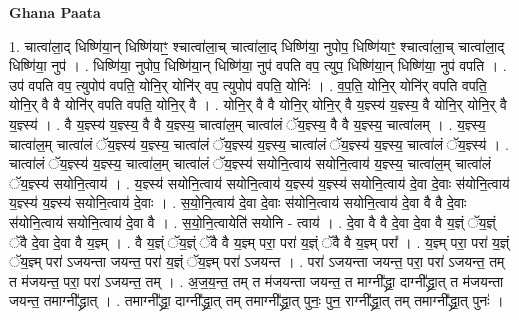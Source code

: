 \documentclass[17pt]{extarticle}
\begin{document}
\textbf{Ghana Paata } \newline

1. चात्वा॑ला॒द् धिष्णि॑या॒न् धिष्णि॑याꣳ॒॒ श्चात्वा॑ला॒च् चात्वा॑ला॒द् धिष्णि॑या॒ नुपोप॒ धिष्णि॑याꣳ॒॒ श्चात्वा॑ला॒च् चात्वा॑ला॒द् धिष्णि॑या॒ नुप॑ । . धिष्णि॑या॒ नुपोप॒ धिष्णि॑या॒न् धिष्णि॑या॒ नुप॑ वपति वप॒ त्युप॒ धिष्णि॑या॒न् धिष्णि॑या॒ नुप॑ वपति । . उप॑ वपति वप॒ त्युपोप॑ वपति॒ योनि॒र् योनि॑र् वप॒ त्युपोप॑ वपति॒ योनिः॑ । . व॒प॒ति॒ योनि॒र् योनि॑र् वपति वपति॒ योनि॒र् वै वै योनि॑र् वपति वपति॒ योनि॒र् वै । . योनि॒र् वै वै योनि॒र् योनि॒र् वै य॒ज्ञ्स्य॑ य॒ज्ञ्स्य॒ वै योनि॒र् योनि॒र् वै य॒ज्ञ्स्य॑ । . वै य॒ज्ञ्स्य॑ य॒ज्ञ्स्य॒ वै वै य॒ज्ञ्स्य॒ चात्वा॑ल॒म् चात्वा॑लं ॅय॒ज्ञ्स्य॒ वै वै य॒ज्ञ्स्य॒ चात्वा॑लम् । . य॒ज्ञ्स्य॒ चात्वा॑ल॒म् चात्वा॑लं ॅय॒ज्ञ्स्य॑ य॒ज्ञ्स्य॒ चात्वा॑लं ॅय॒ज्ञ्स्य॑ य॒ज्ञ्स्य॒ चात्वा॑लं ॅय॒ज्ञ्स्य॑ य॒ज्ञ्स्य॒ चात्वा॑लं ॅय॒ज्ञ्स्य॑ । . चात्वा॑लं ॅय॒ज्ञ्स्य॑ य॒ज्ञ्स्य॒ चात्वा॑ल॒म् चात्वा॑लं ॅय॒ज्ञ्स्य॑ सयोनि॒त्वाय॑ सयोनि॒त्वाय॑ य॒ज्ञ्स्य॒ चात्वा॑ल॒म् चात्वा॑लं ॅय॒ज्ञ्स्य॑ सयोनि॒त्वाय॑ । . य॒ज्ञ्स्य॑ सयोनि॒त्वाय॑ सयोनि॒त्वाय॑ य॒ज्ञ्स्य॑ य॒ज्ञ्स्य॑ सयोनि॒त्वाय॑ दे॒वा दे॒वाः स॑योनि॒त्वाय॑ य॒ज्ञ्स्य॑ य॒ज्ञ्स्य॑ सयोनि॒त्वाय॑ दे॒वाः । . स॒यो॒नि॒त्वाय॑ दे॒वा दे॒वाः स॑योनि॒त्वाय॑ सयोनि॒त्वाय॑ दे॒वा वै वै दे॒वाः स॑योनि॒त्वाय॑ सयोनि॒त्वाय॑ दे॒वा वै । . स॒यो॒नि॒त्वायेति॑ सयोनि - त्वाय॑ । . दे॒वा वै वै दे॒वा दे॒वा वै य॒ज्ञ्ं ॅय॒ज्ञ्ं ॅवै दे॒वा दे॒वा वै य॒ज्ञ्म् । . वै य॒ज्ञ्ं ॅय॒ज्ञ्ं ॅवै वै य॒ज्ञ्म् परा॒ परा॑ य॒ज्ञ्ं ॅवै वै य॒ज्ञ्म् परा᳚ । . य॒ज्ञ्म् परा॒ परा॑ य॒ज्ञ्ं ॅय॒ज्ञ्म् परा॑ ऽजयन्ता जयन्त॒ परा॑ य॒ज्ञ्ं ॅय॒ज्ञ्म् परा॑ ऽजयन्त । . परा॑ ऽजयन्ता जयन्त॒ परा॒ परा॑ ऽजयन्त॒ तम् त म॑जयन्त॒ परा॒ परा॑ ऽजयन्त॒ तम् । . अ॒ज॒य॒न्त॒ तम् त म॑जयन्ता जयन्त॒ त माग्नी᳚द्ध्रा॒ दाग्नी᳚द्ध्रा॒त् त म॑जयन्ता जयन्त॒ तमाग्नी᳚द्ध्रात् । . तमाग्नी᳚द्ध्रा॒ दाग्नी᳚द्ध्रा॒त् तम् तमाग्नी᳚द्ध्रा॒त् पुनः॒ पुन॒ राग्नी᳚द्ध्रा॒त् तम् तमाग्नी᳚द्ध्रा॒त् पुनः॑ । \newline
\end{document}
